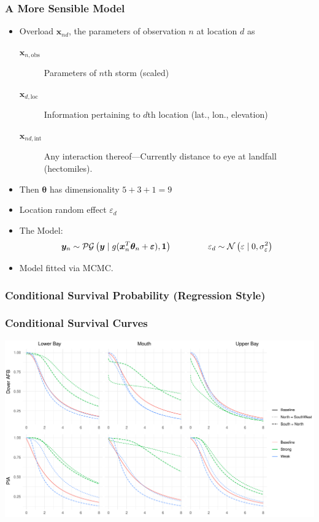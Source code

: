 \documentclass[aspectratio=169,10pt]{beamer}
\newlength{\frametextheight}
\begin{document}
\begin{frame}
    \frametitle{A More Sensible Model}
    \begin{itemize}
        \item Overload $\bm{x}_{nd}$, the parameters of observation $n$ at location $d$ as
        \begin{description}
            \item[$\bm{x}_{n,\text{obs}}$] Parameters of $n$th storm (scaled)
            \item[$\bm{x}_{d,\text{loc}}$] Information pertaining to $d$th location 
                (lat., lon., elevation)
            \item[$\bm{x}_{nd,\text{int}}$] Any interaction thereof---Currently 
                distance to eye at landfall (hectomiles).
        \end{description}
        \item Then $\bm{\theta}$ has dimensionality $5 + 3 + 1 = 9$
        \item Location random effect $\varepsilon_d$
        \item The Model:
        \[
            \bm{y}_n \sim \mathcal{PG}\left(\bm{y}\mid g(\bm{x}_n^T\bm{\theta}_n 
                + \bm{\varepsilon}), \bm{1}\right)
            \hspace{1.5cm}
            \varepsilon_d \sim \mathcal{N}\left(\varepsilon\mid 0, 
                \sigma_{\varepsilon}^2\right)
        \]
        \item Model fitted via MCMC.
    \end{itemize}
\end{frame} %

\subsubsection{Conditional Survival Probability (Regression Style)}

\begin{frame}
    \frametitle{Conditional Survival Curves}
    \begin{center}
        \includegraphics[height=0.99\frametextheight]{./ch3/plots/condsurv_reg/condsurv_reg_1d_std}
    \end{center}
\end{frame}
\end{document}
